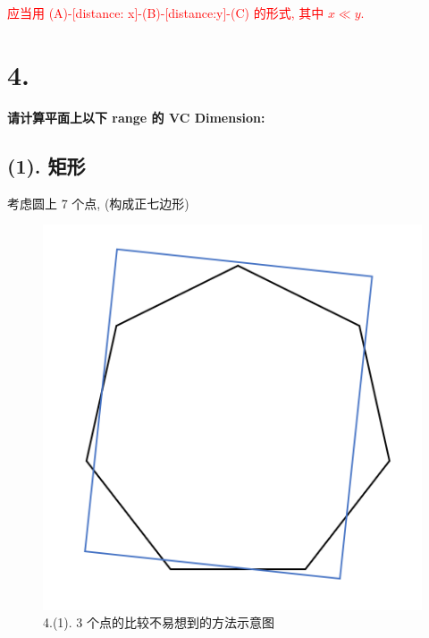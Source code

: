 \documentclass[UTF8]{article}
\begin{document}
\textcolor{red}{
应当用 (A)-[distance: x]-(B)-[distance:y]-(C) 的形式, 其中 $x \ll y$.
}

\section*{4.}
\noindent \textbf{请计算平面上以下 range 的 VC Dimension:}
\subsection*{(1). 矩形}
\noindent 考虑圆上 7 个点, (构成正七边形)
\begin{center}
\begin{minipage}{\linewidth/4}
\begin{figure}[H]
	\centering
	\includegraphics[width=\linewidth]{image/4.1.3.png}
	\caption{4.(1). 3 个点的比较不易想到的方法示意图}
\end{figure}
\end{minipage}
\begin{minipage}{\linewidth/4}
\begin{figure}[H]
	\centering

\end{figure}
\end{minipage}
\end{center}
\end{document}
